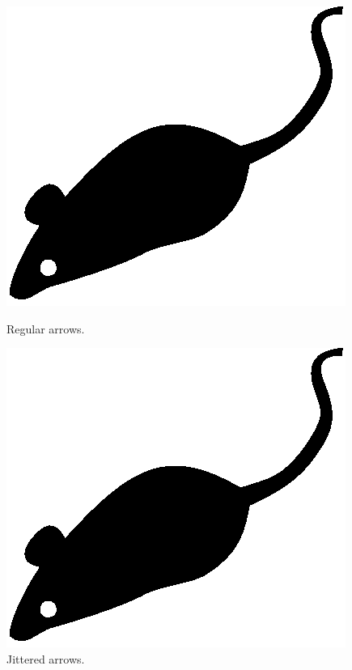 \begin{figure}[tp]
    \begin{minipage}[t]{0.45\linewidth}
        \centering
        \includegraphics{./fig/acmlarge-mouse}
        \caption{Regular arrows.}
        \label{regularfig}
    \end{minipage}
    \hspace{0.1\linewidth}
    \begin{minipage}[t]{0.45\linewidth}
        \centering
        \includegraphics{./fig/acmlarge-mouse}
        \caption{Jittered arrows.}
        \label{jitteredfig}
    \end{minipage}
\end{figure}

